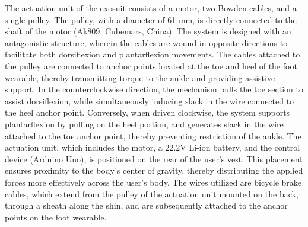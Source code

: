\documentclass[journal,article,submit,pdftex,moreauthors]{Definitions/mdpi}
\begin{document}
The actuation unit of the exosuit consists of a motor, two Bowden cables, and a single pulley. The pulley, with a diameter of 61 mm, is directly connected to the shaft of the motor (Ak809, Cubemars, China). The system is designed with an antagonistic structure, wherein the cables are wound in opposite directions to facilitate both dorsiflexion and plantarflexion movements. The cables attached to the pulley are connected to anchor points located at the toe and heel of the foot wearable, thereby transmitting torque to the ankle and providing assistive support. In the counterclockwise direction, the mechanism pulls the toe section to assist dorsiflexion, while simultaneously inducing slack in the wire connected to the heel anchor point. Conversely, when driven clockwise, the system supports plantarflexion by pulling on the heel portion, and generates slack in the wire attached to the toe anchor point, thereby preventing restriction of the ankle. The actuation unit, which includes the motor, a 22.2V Li-ion battery, and the control device (Arduino Uno), is positioned on the rear of the user's vest. This placement ensures proximity to the body's center of gravity, thereby distributing the applied forces more effectively across the user's body. The wires utilized are bicycle brake cables, which extend from the pulley of the actuation unit mounted on the back, through a sheath along the shin, and are subsequently attached to the anchor points on the foot wearable.
\end{document}
